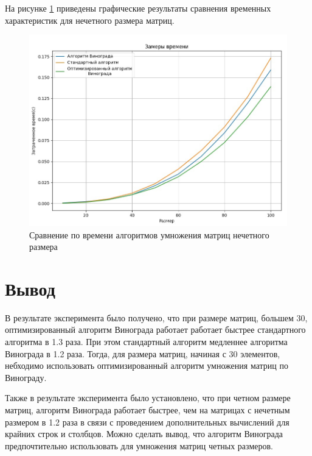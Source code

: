 На рисунке \ref{img:odd} приведены графические результаты сравнения временных характеристик для нечетного размера матриц.

\begin{figure}[H]
	\begin{center}
		\includegraphics[scale=0.5]{img/odd.jpg}
	\end{center}
	\captionsetup{justification=centering}
	\caption{Сравнение по времени алгоритмов умножения матриц нечетного размера}
	\label{img:odd}
\end{figure}

\section{Вывод}

В результате эксперимента было получено, что при размере матриц, большем 30, оптимизированный алгоритм Винограда работает работает быстрее стандартного алгоритма в 1.3 раза. При этом стандартный алгоритм медленнее алгоритма Винограда в 1.2 раза. Тогда, для размера матриц, начиная с 30 элементов, небходимо использовать оптимизированный алгоритм умножения матриц по Винограду.

Также в результате эксперимента было установлено, что при четном размере матриц, алгоритм Винограда работает быстрее, чем на матрицах с нечетным размером в 1.2 раза в связи с проведением дополнительных вычислений для крайних строк и столбцов. Можно сделать вывод, что алгоритм Винограда предпочтительно использовать для умножения матриц четных размеров.